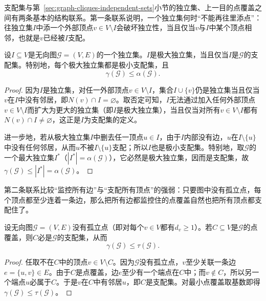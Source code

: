 支配集与第~\ref{sec:graph-cliques-independent-sets}小节的独立集、上一目的点覆盖之间有两条基本的结构联系。第一条联系说明，一个独立集何时“不能再往里添点”：往独立集$I$中添一个外部顶点$v\in V\setminus I$会破坏独立性，当且仅当$v$与$I$中某个顶点相邻，也就是$v$已经被$I$支配。

\begin{theorem}[极大独立集与支配集的等价性]
\label{thm:graph-maximal-indep-dominating}
设$I\subseteq V$是无向图$\mathcal G=(V,E)$的一个独立集。$I$是极大独立集，当且仅当$I$是$\mathcal G$的支配集。特别地，每个极大独立集都是极小支配集，且
\begin{equation}
\gamma(\mathcal G)\leq\alpha(\mathcal G).
\label{eq:graph-domination-independence}
\end{equation}
\end{theorem}

\begin{proof}
因为$I$是独立集，对任一外部顶点$v\in V\setminus I$，集合$I\cup\{v\}$仍是独立集当且仅当$v$在$I$中没有邻居，即$N(v)\cap I=\varnothing$。取否定可知，$I$无法通过加入任何外部顶点$v\in V\setminus I$而扩大为更大的独立集（即$I$是极大独立集），当且仅当对所有$v\in V\setminus I$都有$N(v)\cap I\neq\varnothing$，这正是$I$为支配集的定义。

进一步地，若从极大独立集$I$中删去任一顶点$u\in I$，由于$I$内部没有边，$u$在$I\setminus\{u\}$中没有任何邻居，从而$u$不被$I\setminus\{u\}$支配；所以$I$也是极小支配集。特别地，取$\mathcal G$的一个最大独立集$I^*$（$|I^*|=\alpha(\mathcal G)$），它必然是极大独立集，因而是支配集，故$\gamma(\mathcal G)\leq |I^*|=\alpha(\mathcal G)$。
\end{proof}

第二条联系比较“监控所有边”与“支配所有顶点”的强弱：只要图中没有孤立点，每个顶点都至少连着一条边，那么把所有边都监控住的点覆盖自然也把所有顶点都支配住了。

\begin{theorem}[无孤立点图中点覆盖与支配集的关系]
\label{thm:graph-vertex-cover-dominating}
设无向图$\mathcal G=(V,E)$没有孤立点（即对每个$v\in V$都有$d_v\geq 1$）。若$C\subseteq V$是$\mathcal G$的点覆盖，则$C$必是$\mathcal G$的支配集，从而
\begin{equation}
\gamma(\mathcal G)\leq\tau(\mathcal G).
\label{eq:graph-domination-vertex-cover}
\end{equation}
\end{theorem}

\begin{proof}
任取不在$C$中的顶点$v\in V\setminus C$。因为$\mathcal G$没有孤立点，$v$至少关联一条边$e=\{u,v\}\in E$。由于$C$是点覆盖，边$e$至少有一个端点在$C$中；而$v\notin C$，所以另一个端点$u$必属于$C$。于是$v$在$C$中有邻居$u$，即$C$是支配集。对最小点覆盖取基数即得$\gamma(\mathcal G)\leq\tau(\mathcal G)$。
\end{proof}

